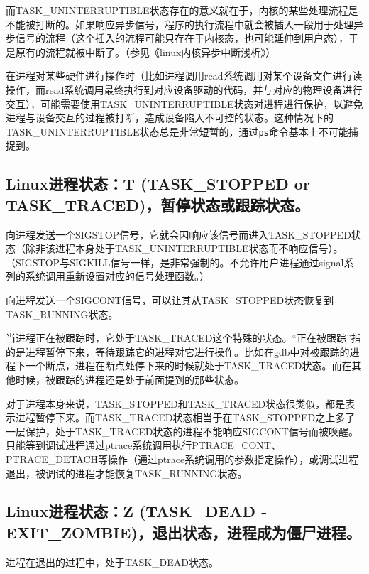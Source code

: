 \documentclass[doctor,openright,twoside]{sjtuthesis}
\newcommand{\passthrough}[1]{#1}
\theoremstyle{plain}
\theoremstyle{definition}
\theoremstyle{remark}
\theoremstyle{ocrenumbox}
\theoremstyle{plain}
\begin{document}
而TASK\_UNINTERRUPTIBLE状态存在的意义就在于，内核的某些处理流程是不能被打断的。如果响应异步信号，程序的执行流程中就会被插入一段用于处理异步信号的流程（这个插入的流程可能只存在于内核态，也可能延伸到用户态），于是原有的流程就被中断了。（参见《linux内核异步中断浅析》）

在进程对某些硬件进行操作时（比如进程调用read系统调用对某个设备文件进行读操作，而read系统调用最终执行到对应设备驱动的代码，并与对应的物理设备进行交互），可能需要使用TASK\_UNINTERRUPTIBLE状态对进程进行保护，以避免进程与设备交互的过程被打断，造成设备陷入不可控的状态。这种情况下的TASK\_UNINTERRUPTIBLE状态总是非常短暂的，通过\passthrough{\lstinline!ps!}命令基本上不可能捕捉到。

\hypertarget{linuxt-task_stopped-or-task_traced}{%
\subsection{Linux进程状态：T (TASK\_STOPPED or
TASK\_TRACED)，暂停状态或跟踪状态。}\label{linuxt-task_stopped-or-task_traced}}

向进程发送一个SIGSTOP信号，它就会因响应该信号而进入TASK\_STOPPED状态（除非该进程本身处于TASK\_UNINTERRUPTIBLE状态而不响应信号）。（SIGSTOP与SIGKILL信号一样，是非常强制的。不允许用户进程通过signal系列的系统调用重新设置对应的信号处理函数。）

向进程发送一个SIGCONT信号，可以让其从TASK\_STOPPED状态恢复到TASK\_RUNNING状态。

当进程正在被跟踪时，它处于TASK\_TRACED这个特殊的状态。``正在被跟踪''指的是进程暂停下来，等待跟踪它的进程对它进行操作。比如在gdb中对被跟踪的进程下一个断点，进程在断点处停下来的时候就处于TASK\_TRACED状态。而在其他时候，被跟踪的进程还是处于前面提到的那些状态。

对于进程本身来说，TASK\_STOPPED和TASK\_TRACED状态很类似，都是表示进程暂停下来。而TASK\_TRACED状态相当于在TASK\_STOPPED之上多了一层保护，处于TASK\_TRACED状态的进程不能响应SIGCONT信号而被唤醒。只能等到调试进程通过ptrace系统调用执行PTRACE\_CONT、PTRACE\_DETACH等操作（通过ptrace系统调用的参数指定操作），或调试进程退出，被调试的进程才能恢复TASK\_RUNNING状态。

\hypertarget{linuxz-task_dead---exit_zombie}{%
\subsection{Linux进程状态：Z (TASK\_DEAD -
EXIT\_ZOMBIE)，退出状态，进程成为僵尸进程。}\label{linuxz-task_dead---exit_zombie}}

进程在退出的过程中，处于TASK\_DEAD状态。
\end{document}
